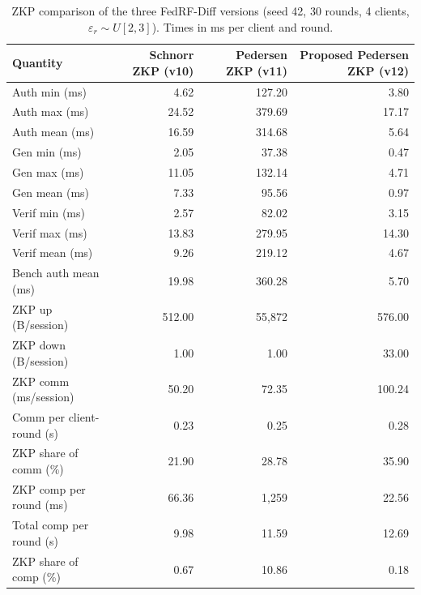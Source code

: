 \begin{table}[t]
\centering
\caption{ZKP comparison of the three FedRF-Diff versions (seed 42, 30 rounds, 4 clients, $\varepsilon_r \sim U[2,3]$). Times in ms per client and round.}
\label{tab:zkp_comparison}
\begin{tabular}{lrrr}
\toprule
Quantity & Schnorr ZKP (v10) & Pedersen ZKP (v11) & Proposed Pedersen ZKP (v12) \\
\midrule
Auth min (ms) & 4.62 & 127.20 & 3.80 \\
Auth max (ms) & 24.52 & 379.69 & 17.17 \\
Auth mean (ms) & 16.59 & 314.68 & 5.64 \\
Gen min (ms) & 2.05 & 37.38 & 0.47 \\
Gen max (ms) & 11.05 & 132.14 & 4.71 \\
Gen mean (ms) & 7.33 & 95.56 & 0.97 \\
Verif min (ms) & 2.57 & 82.02 & 3.15 \\
Verif max (ms) & 13.83 & 279.95 & 14.30 \\
Verif mean (ms) & 9.26 & 219.12 & 4.67 \\
Bench auth mean (ms) & 19.98 & 360.28 & 5.70 \\
ZKP up (B/session) & 512.00 & 55,872 & 576.00 \\
ZKP down (B/session) & 1.00 & 1.00 & 33.00 \\
ZKP comm (ms/session) & 50.20 & 72.35 & 100.24 \\
Comm per client-round (s) & 0.23 & 0.25 & 0.28 \\
ZKP share of comm (\%) & 21.90 & 28.78 & 35.90 \\
ZKP comp per round (ms) & 66.36 & 1,259 & 22.56 \\
Total comp per round (s) & 9.98 & 11.59 & 12.69 \\
ZKP share of comp (\%) & 0.67 & 10.86 & 0.18 \\
\bottomrule
\end{tabular}
\end{table}

